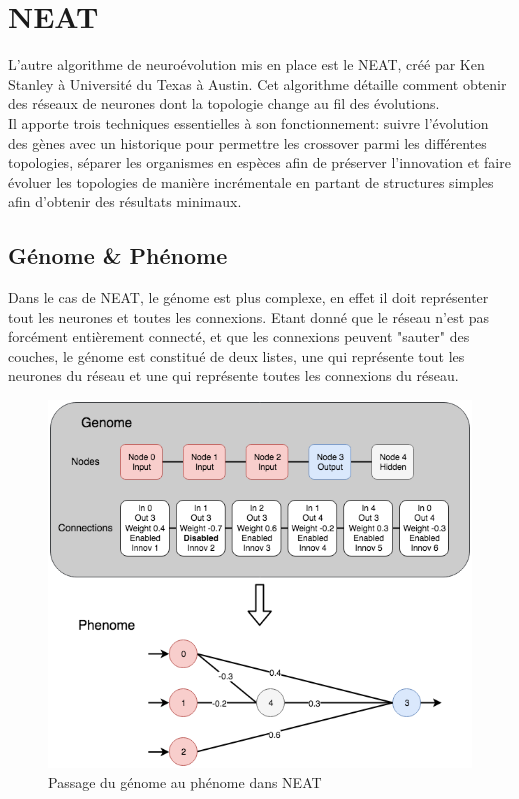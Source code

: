 \documentclass{article}
\begin{document}
\section{NEAT}

L'autre algorithme de neuroévolution mis en place est le NEAT, créé par Ken Stanley à Université du Texas à Austin. Cet algorithme détaille comment obtenir des réseaux de neurones dont la topologie change au fil des évolutions.\\
Il apporte trois techniques essentielles à son fonctionnement: suivre l'évolution des gènes avec un historique pour permettre les crossover parmi les différentes topologies, séparer les organismes en espèces afin de préserver l'innovation et faire évoluer les topologies de manière incrémentale en partant de structures simples afin d'obtenir des résultats minimaux.\cite{wikineat}

\subsection{Génome \& Phénome}

Dans le cas de NEAT, le génome est plus complexe, en effet il doit représenter tout les neurones et toutes les connexions. Etant donné que le réseau n'est pas forcément entièrement connecté, et que les connexions peuvent "sauter" des couches, le génome est constitué de deux listes, une qui représente tout les neurones du réseau et une qui représente toutes les connexions du réseau. 

\begin{figure}[H]
\begin{center}
	\includegraphics[scale=0.55]{genomephenomeneat.png}
	\caption{Passage du génome au phénome dans NEAT}
\end{center}
\end{figure}
\end{document}
